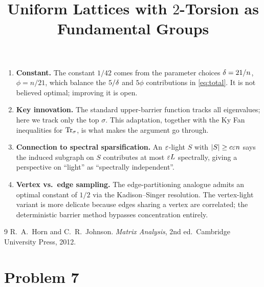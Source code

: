 \documentclass[11pt]{article}
\begin{document}
\begin{enumerate}\setlength\itemsep{4pt}
\item \textbf{Constant.} The constant $1/42$ comes from the parameter choices
$\delta=21/n$, $\phi=n/21$, which balance the $5/\delta$ and $5\phi$ contributions
in \eqref{eq:total}. It is not believed optimal; improving it is open.
\item \textbf{Key innovation.} The standard upper-barrier function tracks all
eigenvalues; here we track only the top $\sigma$. This adaptation, together
with the Ky Fan inequalities for $\operatorname{Tr}_{\sigma}$, is what makes the argument go
through.
\item \textbf{Connection to spectral sparsification.} An $\varepsilon$-light $S$ with
$|S|\ge c\varepsilon n$ says the induced subgraph on $S$ contributes at most $\varepsilon L$
spectrally, giving a perspective on ``light'' as ``spectrally independent''.
\item \textbf{Vertex vs.\ edge sampling.} The edge-partitioning analogue
admits an optimal constant of $1/2$ via the Kadison--Singer resolution. The
vertex-light variant is more delicate because edges sharing a vertex are
correlated; the deterministic barrier method bypasses concentration entirely.
\end{enumerate}

\begin{thebibliography}{9}
 R.~A.~Horn and C.~R.~Johnson.
  \emph{Matrix Analysis}, 2nd ed.\ Cambridge University Press, 2012.
\end{thebibliography}

\endgroup

\clearpage
\section*{Problem 7}
\begingroup
\hypersetup{colorlinks=true,
            linkcolor=blue!50!black,
            citecolor=blue!50!black,
            urlcolor=blue!50!black}
\newcommand{\qsevenR}{\mathbb{R}}
\newcommand{\qsevenQ}{\mathbb{Q}}
\newcommand{\qsevenZ}{\mathbb{Z}}
\newcommand{\qsevenLgp}{\mathbb{L}}
\newcommand{\qsevensign}{\operatorname{sign}}
\newcommand{\qsevencd}{\operatorname{cd}}
\newcommand{\qseventM}{\widetilde M}
\newcommand{\qsevenim}{\operatorname{im}}
\newtheorem{qseventheorem}{Theorem}
\newtheorem{qsevenlemma}{Lemma}
\newtheorem{qsevenproposition}{Proposition}
\title{Uniform Lattices with $2$-Torsion as Fundamental Groups}
\author{}
\date{}
\maketitle
\end{document}

